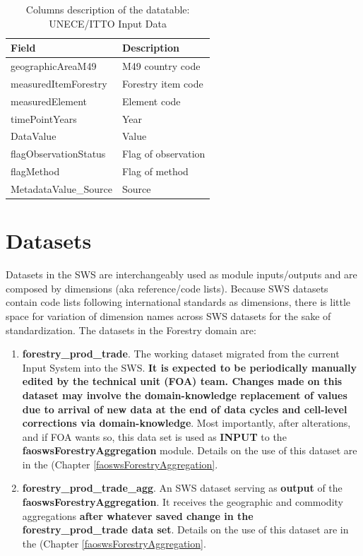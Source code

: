 \documentclass[
]{book}
\begin{document}
\begin{table}

\caption{\label{tab:uneceittoinputdata}Columns description of the datatable: UNECE/ITTO Input Data}
\centering
\fontsize{14}{16}\selectfont
\begin{tabular}[t]{l|l}
\hline
\rowcolor[HTML]{a9c9a7}  Field & Description\\
\hline
geographicAreaM49 & M49 country code\\
\hline
measuredItemForestry & Forestry item code\\
\hline
measuredElement & Element code\\
\hline
timePointYears & Year\\
\hline
DataValue & Value\\
\hline
flagObservationStatus & Flag of observation\\
\hline
flagMethod & Flag of method\\
\hline
MetadataValue\_Source & Source\\
\hline
\end{tabular}
\end{table}

\hypertarget{datasets}{%
\section{Datasets}\label{datasets}}

Datasets in the SWS are interchangeably used as module inputs/outputs and are composed by dimensions (aka reference/code lists). Because SWS datasets contain code lists following international standards as dimensions, there is little space for variation of dimension names across SWS datasets for the sake of standardization. The datasets in the Forestry domain are:

\begin{enumerate}
\def\labelenumi{\arabic{enumi}.}
\item
  \textbf{forestry\_prod\_trade}. The working dataset migrated from the current Input System into the SWS. \textbf{It is expected to be periodically manually edited by the technical unit (FOA) team. Changes made on this dataset may involve the domain-knowledge replacement of values due to arrival of new data at the end of data cycles and cell-level corrections via domain-knowledge}. Most importantly, after alterations, and if FOA wants so, this data set is used as \textbf{INPUT} to the \textbf{faoswsForestryAggregation} module. Details on the use of this dataset are in the (Chapter \ref{faoswsForestryAggregation}.
\item
  \textbf{forestry\_prod\_trade\_agg}. An SWS dataset serving as \textbf{output} of the \textbf{faoswsForestryAggregation}. It receives the geographic and commodity aggregations \textbf{after whatever saved change in the forestry\_prod\_trade data set}. Details on the use of this dataset are in the (Chapter \ref{faoswsForestryAggregation}.
\end{enumerate}
\end{document}
